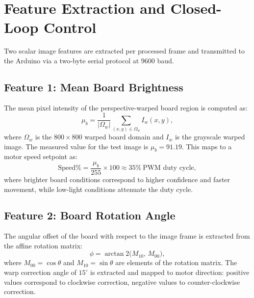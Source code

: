 \documentclass[conference]{IEEEtran}
\begin{document}
\section{Feature Extraction and Closed-Loop Control}
\label{sec:features}

Two scalar image features are extracted per processed frame and transmitted
to the Arduino via a two-byte serial protocol at 9600 baud.

\subsection{Feature 1: Mean Board Brightness}

The mean pixel intensity of the perspective-warped board region is computed as:
\begin{equation}
  \mu_b = \frac{1}{|\Omega_w|} \sum_{(x,y)\in\Omega_w} I_w(x,y),
  \label{eq:mean_brightness}
\end{equation}
where \(\Omega_w\) is the \(800\times800\) warped board domain and \(I_w\)
is the grayscale warped image. The measured value for the test image is
\(\mu_b = 91.19\). This maps to a motor speed setpoint as:
\begin{equation}
  \text{Speed\%} = \frac{\mu_b}{255} \times 100 \approx 35\%\ \text{PWM duty cycle},
  \label{eq:speed_map}
\end{equation}
where brighter board conditions correspond to higher confidence and faster
movement, while low-light conditions attenuate the duty cycle.

\subsection{Feature 2: Board Rotation Angle}

The angular offset of the board with respect to the image frame is extracted
from the affine rotation matrix:
\begin{equation}
  \phi = \arctan2\!\bigl(M_{10},\,M_{00}\bigr),
  \label{eq:angle}
\end{equation}
where \(M_{00} = \cos\theta\) and \(M_{10} = \sin\theta\) are elements of
the rotation matrix. The warp correction angle of \(15^{\circ}\) is
extracted and mapped to motor direction: positive values correspond to
clockwise correction, negative values to counter-clockwise correction.
\end{document}
